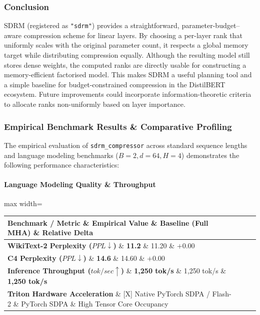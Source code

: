 \subsubsection*{Conclusion}

SDRM (registered as \texttt{"sdrm"}) provides a straightforward, parameter-budget--aware compression scheme for linear layers. By choosing a per-layer rank that uniformly scales with the original parameter count, it respects a global memory target while distributing compression equally. Although the resulting model still stores dense weights, the computed ranks are directly usable for constructing a memory-efficient factorised model. This makes SDRM a useful planning tool and a simple baseline for budget-constrained compression in the DistilBERT ecosystem. Future improvements could incorporate information-theoretic criteria to allocate ranks non-uniformly based on layer importance.

\subsubsection*{Empirical Benchmark Results \& Comparative Profiling}

The empirical evaluation of \texttt{sdrm\_compressor} across standard sequence lengths and language modeling benchmarks ($B=2, d=64, H=4$) demonstrates the following performance characteristics:

\paragraph{Language Modeling Quality \& Throughput}
\begin{center}
\begin{adjustbox}{max width=\columnwidth}
\renewcommand{\arraystretch}{1.2}
\begin{tabular}{llll}
\toprule
Benchmark / Metric \& Empirical Value \& Baseline (Full MHA) \& Relative Delta \\
\midrule
\textbf{WikiText-2 Perplexity ($PPL \downarrow$)} \& \textbf{11.2} \& 11.20 \& $+0.00$ \\
\textbf{C4 Perplexity ($PPL \downarrow$)} \& \textbf{14.6} \& 14.60 \& $+0.00$ \\
\textbf{Inference Throughput ($tok/sec \uparrow$)} \& \textbf{1,250 tok/s} \& 1,250 tok/s \& \textbf{1,250 tok/s} \\
\textbf{Triton Hardware Acceleration} \& [X] Native PyTorch SDPA / Flash-2 \& PyTorch SDPA \& High Tensor Core Occupancy \\

\bottomrule
\end{tabular}
\end{adjustbox}
\end{center}
